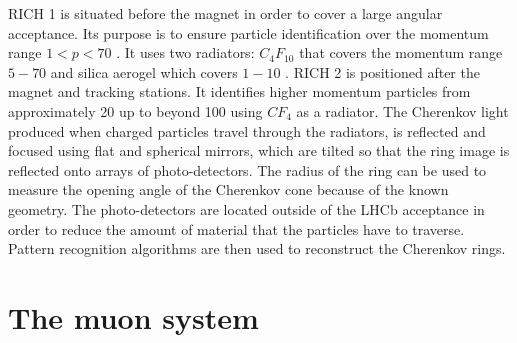 RICH 1 is situated before the magnet in order to cover a large angular acceptance. Its purpose is to ensure
particle identification over the momentum range $1 < p < 70$ \gevc. It uses two radiators: $C_4F_{10}$ that covers
the momentum range $5 - 70$ \gevc and silica aerogel which covers $1 - 10$ \gevc. RICH 2 is positioned after
the magnet and tracking stations. It identifies higher momentum particles from approximately 20 \gevc up to beyond
100 \gevc using $CF_4$ as a radiator.
The Cherenkov light produced when charged particles travel through the radiators, is reflected and focused using
flat and spherical mirrors, which are tilted so that the ring image is reflected onto arrays of photo-detectors.
The radius of the ring can be used to measure the opening angle of the Cherenkov cone because of the known geometry.
The photo-detectors are located outside of the LHCb acceptance in order to reduce the amount of material that
the particles have to traverse. Pattern recognition algorithms are then used to reconstruct the Cherenkov rings.



\section{The muon system}

